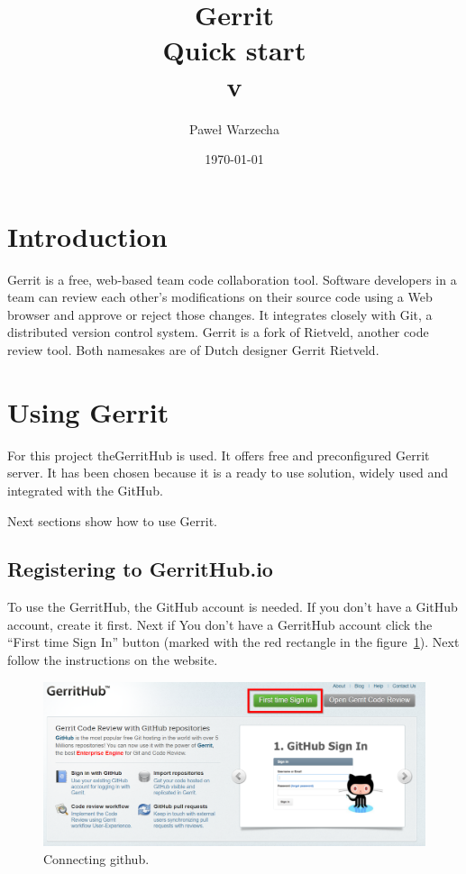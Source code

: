 \documentclass{article}
\title{Gerrit \\ Quick start \\ \small{v\version}}
\author{Paweł Warzecha}
\date{\today}
\begin{document}
\maketitle
\newpage

\tableofcontents
\newpage

\section{Introduction}

Gerrit is a free, web-based team code collaboration tool. Software developers in a team can review each other's modifications on their source code using a Web browser and approve or reject those changes. It integrates closely with Git, a distributed version control system. Gerrit is a fork of Rietveld, another code review tool. Both namesakes are of Dutch designer Gerrit Rietveld.\cite{Gerrit}

\section{Using Gerrit}

For this project theGerritHub\cite{GerritHub} is used. It offers free and preconfigured Gerrit server. It has been chosen because it is a ready to use solution, widely used and integrated with the GitHub. 

Next sections show how to use Gerrit.

\subsection{Registering to GerritHub.io}

To use the GerritHub, the GitHub account is needed. If you don't have a GitHub account, create it first. Next if You don't have a GerritHub account click the ``First time Sign In'' button (marked with the red rectangle in the figure~\ref{fig:Register}). Next follow the instructions on the website.

\begin{figure}[!ht]
  \centering
  \includegraphics[width=.75\textwidth]{img/RegisterToGerritHub}
  \caption{Connecting github.}
  \label{fig:Register}
\end{figure}
\end{document}
